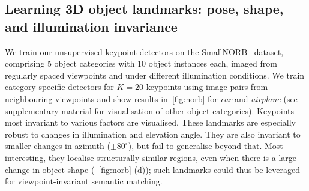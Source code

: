 \documentclass{article}
\begin{document}
\subsection{Learning 3D object landmarks: pose, shape, and illumination invariance}\label{s:norb}


We train our unsupervised keypoint detectors on the SmallNORB~\cite{lecunNORB} dataset, comprising 5 object categories with 10 object instances each, imaged from regularly spaced viewpoints and under different illumination conditions. We train category-specific detectors for $K=20$ keypoints using image-pairs from neighbouring viewpoints and show results in~\cref{fig:norb} for \emph{car} and \emph{airplane} (see supplementary material for visualisation of other object categories). Keypoints most invariant to various factors are visualised. These landmarks are especially robust to changes in illumination and elevation angle. They are also invariant to smaller changes in azimuth ($\pm 80^\circ$), but fail to generalise beyond that. Most interesting, they localise structurally similar regions, even when there is a large change in object shape (\eg~\cref{fig:norb}-(d)); such landmarks could thus be leveraged for viewpoint-invariant semantic matching.
\end{document}
